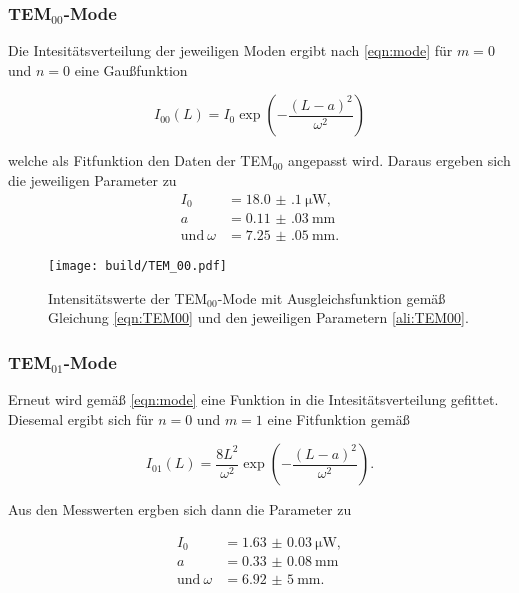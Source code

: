 \subsubsection{TEM$_{00}$-Mode}

Die Intesitätsverteilung der jeweiligen Moden ergibt nach \eqref{eqn:mode} für $m=0$ und $n=0$ eine Gaußfunktion

\begin{equation}
    I_{00}(L) = I_0 \exp{\left(-\frac{(L-a)^2}{\omega^2}\right)}
    \label{eqn:TEM00}
\end{equation} 

welche als Fitfunktion den Daten der TEM$_{00}$ angepasst wird.
Daraus ergeben sich die jeweiligen Parameter zu
\begin{align}
    \label{ali:TEM00}
    I_0 &= \SI{18.0(1)}{\micro\watt}, \\
    a &= \SI{0.11(03)}{\milli\m} \\
    \text{und} \: \omega &= \SI{7.25(05)}{\milli\m}.
\end{align}

\begin{figure}
    \centering
    \texttt{[image: build/TEM\_00.pdf]}
    \caption{Intensitätswerte der TEM$_{00}$-Mode mit Ausgleichsfunktion gemäß Gleichung \eqref{eqn:TEM00} und den jeweiligen Parametern \eqref{ali:TEM00}.}
    \label{fig:TEM00}
\end{figure}


\subsubsection{TEM$_{01}$-Mode}

Erneut wird gemäß \eqref{eqn:mode} eine Funktion in die Intesitätsverteilung gefittet. Diesemal ergibt sich für $n=0$ und $m=1$ 
eine Fitfunktion gemäß

\begin{equation}
    I_{01}(L) = \frac{8L^2}{\omega^2} \exp{\left(-\frac{(L-a)^2}{\omega^2} \right)} .
    \label{eqn:TEM01}
\end{equation}

Aus den Messwerten ergben sich dann die Parameter zu

\begin{align}
    \label{ali:TEM01}
    I_0 &= \SI{1.63(3)}{\micro\watt}, \\
    a &= \SI{0.33(8)}{\milli\m} \\
    \text{und} \: \omega &= \SI{6,92(5)}{\milli\m}.
\end{align}

